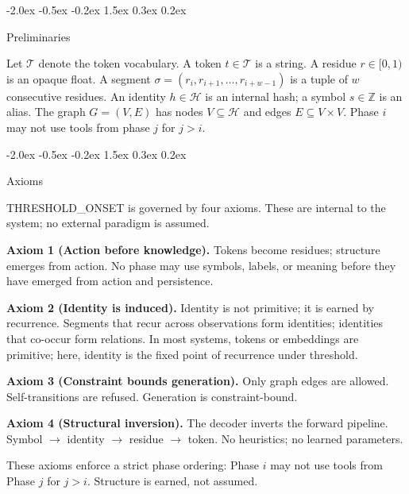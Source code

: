 \documentclass[10pt]{article}
\makeatletter
\renewcommand{\section}{\@startsection{section}{1}{\z@}%
  {-2.0ex \@plus -0.5ex \@minus -0.2ex}%
  {1.5ex \@plus 0.3ex \@minus 0.2ex}%
  {\large\bfseries\raggedright}}
\makeatother
\begin{document}
\section{Preliminaries}
\label{sec:prelim}

Let $\mathcal{T}$ denote the token vocabulary. A token $t \in \mathcal{T}$ is a string. A residue $r \in [0, 1)$ is an opaque float. A segment $\sigma = (r_i, r_{i+1}, \ldots, r_{i+w-1})$ is a tuple of $w$ consecutive residues. An identity $h \in \mathcal{H}$ is an internal hash; a symbol $s \in \mathbb{Z}$ is an alias. The graph $G = (V, E)$ has nodes $V \subseteq \mathcal{H}$ and edges $E \subseteq V \times V$. Phase $i$ may not use tools from phase $j$ for $j > i$.

\section{Axioms}
\label{sec:axioms}

THRESHOLD\_ONSET is governed by four axioms. These are internal to the system; no external paradigm is assumed.

\textbf{Axiom 1 (Action before knowledge).}
Tokens become residues; structure emerges from action. No phase may use symbols, labels, or meaning before they have emerged from action and persistence.

\textbf{Axiom 2 (Identity is induced).}
Identity is not primitive; it is earned by recurrence. Segments that recur across observations form identities; identities that co-occur form relations. In most systems, tokens or embeddings are primitive; here, identity is the fixed point of recurrence under threshold.

\textbf{Axiom 3 (Constraint bounds generation).}
Only graph edges are allowed. Self-transitions are refused. Generation is constraint-bound.

\textbf{Axiom 4 (Structural inversion).}
The decoder inverts the forward pipeline. Symbol $\rightarrow$ identity $\rightarrow$ residue $\rightarrow$ token. No heuristics; no learned parameters.

These axioms enforce a strict phase ordering: Phase $i$ may not use tools from Phase $j$ for $j > i$. Structure is earned, not assumed.

\end{document}

